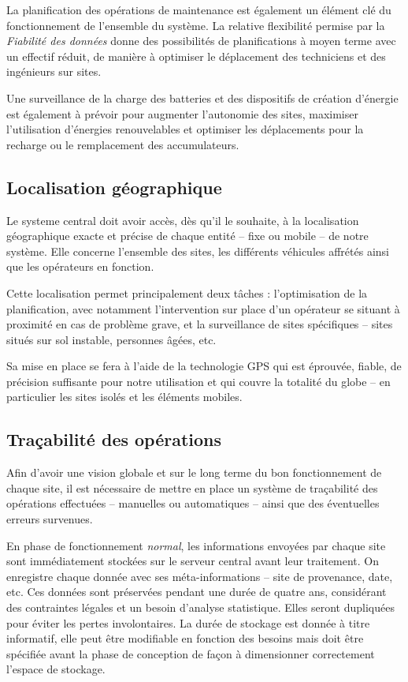\documentclass[a4paper, 11pt]{article}
\begin{document}
La planification des opérations de maintenance est également un
élément clé du fonctionnement de l'ensemble du système. La relative
flexibilité permise par la \textit{Fiabilité des données} donne des
possibilités de planifications à moyen terme avec un effectif réduit,
de manière à optimiser le déplacement des techniciens et des
ingénieurs sur sites.

Une surveillance de la charge des batteries et des dispositifs de
création d'énergie est également à prévoir pour augmenter l'autonomie
des sites, maximiser l'utilisation d'énergies renouvelables et
optimiser les déplacements pour la recharge ou le remplacement des
accumulateurs.


\subsection{Localisation géographique}

Le systeme central doit avoir accès, dès qu'il le souhaite, à la localisation géographique exacte et précise de chaque entité -- fixe ou mobile -- de notre système. Elle concerne l'ensemble des sites, les différents véhicules affrétés ainsi que les opérateurs en fonction.

Cette localisation permet principalement deux tâches : l'optimisation de la planification, avec notamment l'intervention sur place d'un opérateur se situant à proximité en cas de problème grave, et la surveillance de sites spécifiques -- sites situés sur sol instable, personnes âgées, etc.

Sa mise en place se fera à l'aide de la technologie GPS qui est éprouvée, fiable, de précision suffisante pour notre utilisation et qui couvre la totalité du globe -- en particulier les sites isolés et les éléments mobiles.

\subsection{Traçabilité des opérations}

Afin d'avoir une vision globale et sur le long terme du bon fonctionnement de chaque site, il est nécessaire de mettre en place un système de traçabilité des opérations effectuées -- manuelles ou automatiques -- ainsi que des éventuelles erreurs survenues.

En phase de fonctionnement \textit{normal}, les informations envoyées par chaque site sont immédiatement stockées sur le serveur central avant leur traitement. On enregistre chaque donnée avec ses méta-informations -- site de provenance, date, etc. Ces données sont préservées pendant une durée de quatre ans, considérant des contraintes légales et un besoin d'analyse statistique. Elles seront dupliquées pour éviter les pertes involontaires. La durée de stockage est donnée à titre informatif, elle peut être modifiable en fonction des besoins mais doit être spécifiée avant la phase de conception de façon à dimensionner correctement l'espace de stockage.
\end{document}
